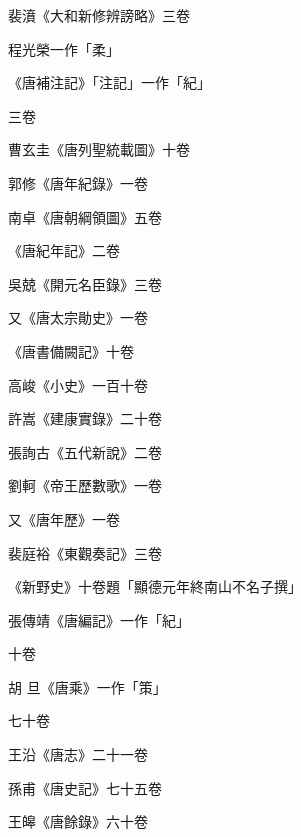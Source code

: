 \begin{pinyinscope}
 裴濆《大和新修辨謗略》三卷



 程光榮一作「柔」



 《唐補注記》「注記」一作「紀」



 三卷



 曹玄圭《唐列聖統載圖》十卷



 郭修《唐年紀錄》一卷



 南卓《唐朝綱領圖》五卷



 《唐紀年記》二卷



 吳兢《開元名臣錄》三卷



 又《唐太宗勛史》一卷



 《唐書備闕記》十卷



 高峻《小史》一百十卷



 許嵩《建康實錄》二十卷



 張詢古《五代新說》二卷



 劉軻《帝王歷數歌》一卷



 又《唐年歷》一卷



 裴庭裕《東觀奏記》三卷



 《新野史》十卷題「顯德元年終南山不名子撰」



 張傳靖《唐編記》一作「紀」



 十卷



 胡
 旦《唐乘》一作「策」



 七十卷



 王沿《唐志》二十一卷



 孫甫《唐史記》七十五卷



 王皞《唐餘錄》六十卷




\end{pinyinscope}
